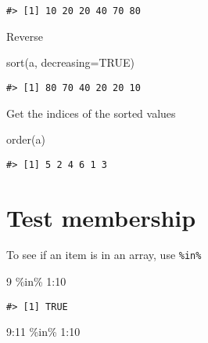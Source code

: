 \documentclass[
]{book}
\newenvironment{Shaded}{\begin{snugshade}}{\end{snugshade}}
\newcommand{\AttributeTok}[1]{\textcolor[rgb]{0.77,0.63,0.00}{#1}}
\newcommand{\ConstantTok}[1]{\textcolor[rgb]{0.00,0.00,0.00}{#1}}
\newcommand{\DecValTok}[1]{\textcolor[rgb]{0.00,0.00,0.81}{#1}}
\newcommand{\FunctionTok}[1]{\textcolor[rgb]{0.00,0.00,0.00}{#1}}
\newcommand{\NormalTok}[1]{#1}
\newcommand{\SpecialCharTok}[1]{\textcolor[rgb]{0.00,0.00,0.00}{#1}}
\begin{document}
\begin{verbatim}
#> [1] 10 20 20 40 70 80
\end{verbatim}

Reverse

\begin{Shaded}
\begin{Highlighting}[]
\FunctionTok{sort}\NormalTok{(a, }\AttributeTok{decreasing=}\ConstantTok{TRUE}\NormalTok{)}
\end{Highlighting}
\end{Shaded}

\begin{verbatim}
#> [1] 80 70 40 20 20 10
\end{verbatim}

Get the indices of the sorted values

\begin{Shaded}
\begin{Highlighting}[]
\FunctionTok{order}\NormalTok{(a)}
\end{Highlighting}
\end{Shaded}

\begin{verbatim}
#> [1] 5 2 4 6 1 3
\end{verbatim}

\hypertarget{test-membership}{%
\section{Test membership}\label{test-membership}}

To see if an item is in an array, use \texttt{\%in\%}

\begin{Shaded}
\begin{Highlighting}[]
\DecValTok{9} \SpecialCharTok{\%in\%} \DecValTok{1}\SpecialCharTok{:}\DecValTok{10}
\end{Highlighting}
\end{Shaded}

\begin{verbatim}
#> [1] TRUE
\end{verbatim}

\begin{Shaded}
\begin{Highlighting}[]
\DecValTok{9}\SpecialCharTok{:}\DecValTok{11} \SpecialCharTok{\%in\%} \DecValTok{1}\SpecialCharTok{:}\DecValTok{10}
\end{Highlighting}
\end{Shaded}
\end{document}
